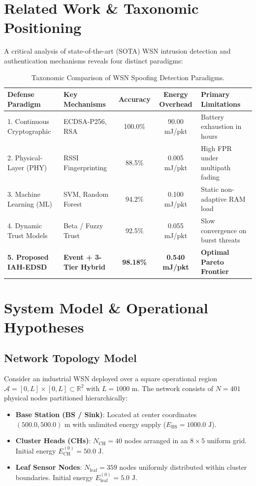 \documentclass[11pt,a4paper,oneside]{book}
\begin{document}
\section{Related Work \& Taxonomic Positioning}
A critical analysis of state-of-the-art (SOTA) WSN intrusion detection and authentication mechanisms reveals four distinct paradigms:

\begin{table}[htbp]
\centering
\small
\caption{Taxonomic Comparison of WSN Spoofing Detection Paradigms.}
\begin{tabular}{|l|l|c|c|l|}
\hline
\textbf{Defense Paradigm} & \textbf{Key Mechanisms} & \textbf{Accuracy} & \textbf{Energy Overhead} & \textbf{Primary Limitations} \\ \hline
1. Continuous Cryptographic & ECDSA-P256, RSA & 100.0\% & 90.00 mJ/pkt & Battery exhaustion in hours \\ \hline
2. Physical-Layer (PHY) & RSSI Fingerprinting & 88.5\% & 0.005 mJ/pkt & High FPR under multipath fading \\ \hline
3. Machine Learning (ML) & SVM, Random Forest & 94.2\% & 0.100 mJ/pkt & Static non-adaptive RAM load \\ \hline
4. Dynamic Trust Models & Beta / Fuzzy Trust & 92.5\% & 0.055 mJ/pkt & Slow convergence on burst threats \\ \hline
\textbf{5. Proposed IAH-EDSD} & \textbf{Event + 3-Tier Hybrid} & \textbf{98.18\%} & \textbf{0.540 mJ/pkt} & \textbf{Optimal Pareto Frontier} \\ \hline
\end{tabular}
\end{table}

\section{System Model \& Operational Hypotheses}
\subsection{Network Topology Model}
Consider an industrial WSN deployed over a square operational region $\mathcal{A} = [0, L] \times [0, L] \subset \mathbb{R}^2$ with $L = 1000\text{ m}$. The network consists of $N = 401$ physical nodes partitioned hierarchically:
\begin{itemize}
    \item \textbf{Base Station (BS / Sink)}: Located at center coordinates $(500.0, 500.0)\text{ m}$ with unlimited energy supply ($E_{\text{BS}} = 1000.0\text{ J}$).
    \item \textbf{Cluster Heads (CHs)}: $N_{\text{CH}} = 40$ nodes arranged in an $8 \times 5$ uniform grid. Initial energy $E_{\text{CH}}^{(0)} = 50.0\text{ J}$.
    \item \textbf{Leaf Sensor Nodes}: $N_{\text{leaf}} = 359$ nodes uniformly distributed within cluster boundaries. Initial energy $E_{\text{leaf}}^{(0)} = 5.0\text{ J}$.
\end{itemize}
\end{document}
